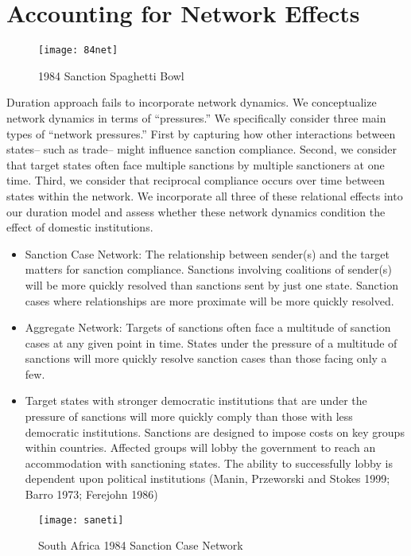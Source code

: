 \section*{Accounting for Network Effects}
\label{neteffects}

\begin{figure}[ht]
  \centering
  \texttt{[image: 84net]}
  \caption{1984 Sanction Spaghetti Bowl}
\end{figure}

Duration approach fails to incorporate network dynamics. We conceptualize network dynamics in terms of ``pressures.'' We specifically consider three main types of ``network pressures.'' First by capturing how other interactions between states-- such as trade-- might influence sanction compliance. Second, we consider that target states often face multiple sanctions by multiple sanctioners at one time. Third, we consider that reciprocal compliance occurs over time between states within the network. We incorporate all three of these relational effects into our duration model and assess whether these network dynamics condition the effect of domestic institutions. 

\begin{itemize}
\item Sanction Case Network: The relationship between sender(s) and the target matters for sanction compliance. Sanctions involving coalitions of sender(s) will be more quickly resolved than sanctions sent by just one state. Sanction cases where relationships are more proximate will be more quickly resolved.
\item Aggregate Network: Targets of sanctions often face a multitude of sanction cases at any given point in time. States under the pressure of a multitude of sanctions will more quickly resolve sanction cases than those facing only a few.
\item Target states with stronger democratic institutions that are under the pressure of sanctions will more quickly comply than those with less democratic institutions. Sanctions are designed to impose costs on key groups within countries. Affected groups will lobby the government to reach an accommodation with sanctioning states. The ability to successfully lobby is dependent upon political institutions (Manin, Przeworski and Stokes 1999; Barro 1973; Ferejohn 1986)
\end{itemize}

\begin{figure}[ht]
	\centering
	\texttt{[image: saneti]}
	\caption{South Africa 1984 Sanction Case Network}
\end{figure}

